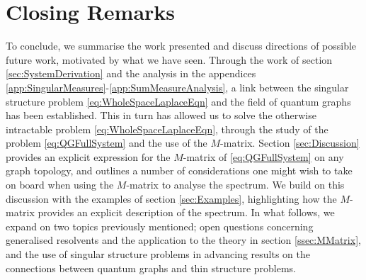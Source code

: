 \section{Closing Remarks} \label{sec:Conclusion}
To conclude, we summarise the work presented and discuss directions of possible future work, motivated by what we have seen.
Through the work of section \ref{sec:SystemDerivation} and the analysis in the appendices \ref{app:SingularMeasures}-\ref{app:SumMeasureAnalysis}, a link between the singular structure problem \eqref{eq:WholeSpaceLaplaceEqn} and the field of quantum graphs has been established.
This in turn has allowed us to solve the otherwise intractable problem \eqref{eq:WholeSpaceLaplaceEqn}, through the study of the problem \eqref{eq:QGFullSystem} and the use of the $M$-matrix.
Section \ref{sec:Discussion} provides an explicit expression for the $M$-matrix of \eqref{eq:QGFullSystem} on any graph topology, and outlines a number of considerations one might wish to take on board when using the $M$-matrix to analyse the spectrum.
We build on this discussion with the examples of section \ref{sec:Examples}, highlighting how the $M$-matrix provides an explicit description of the spectrum.
In what follows, we expand on two topics previously mentioned; open questions concerning generalised resolvents and the application to the theory in section \ref{ssec:MMatrix}, and the use of singular structure problems in advancing results on the connections between quantum graphs and thin structure problems.

